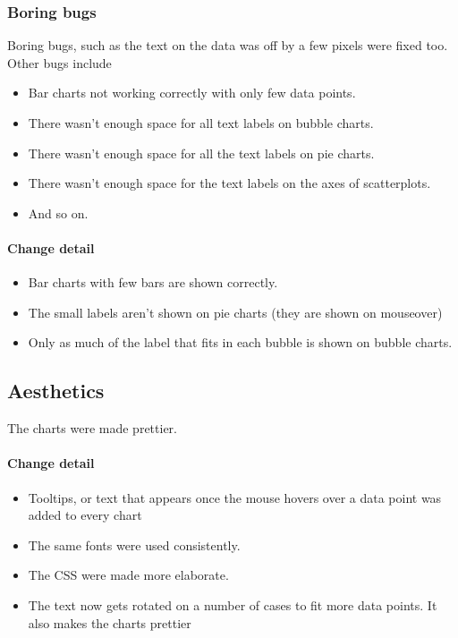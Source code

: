   \subsubsection{Boring bugs}
  Boring bugs, such as the text on the data was off by a few pixels were fixed too.
  Other bugs include 
  \begin{itemize}
  	\item Bar charts not working correctly with only few data points.
  	\item There wasn't enough space for all text labels on bubble charts.
  	\item There wasn't enough space for all the text labels on pie charts.
  	\item There wasn't enough space for the text labels on the axes of scatterplots.
  	\item And so on.
  \end{itemize}
  
  \paragraph{Change detail}
  \begin{itemize}
  	\item Bar charts with few bars are shown correctly. 
  	\item The small labels aren't shown on pie charts (they are shown on mouseover)
  	\item Only as much of the label that fits in each bubble is shown on bubble charts.
\end{itemize}
  


\subsection{Aesthetics}
The charts were made prettier.
  
\paragraph{Change detail}
\begin{itemize}
  \item Tooltips, or text that appears once the mouse hovers over a data point was added to every chart
  \item The same fonts were used consistently.
  \item The CSS were made more elaborate.
  \item The text now gets rotated on a number of cases to fit more data points. It also makes the charts prettier

\end{itemize}
  
